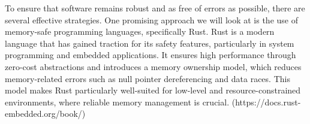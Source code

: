 To ensure that software remains robust and as free of errors as possible, there are several effective strategies. One promising approach we will look at is the use of memory-safe programming languages, specifically Rust. Rust is a modern language that has gained traction for its safety features, particularly in system programming and embedded applications. It ensures high performance through zero-cost abstractions and introduces a memory ownership model, which reduces memory-related errors such as null pointer dereferencing and data races. This model makes Rust particularly well-suited for low-level and resource-constrained environments, where reliable memory management is crucial. (https://docs.rust-embedded.org/book/) \\